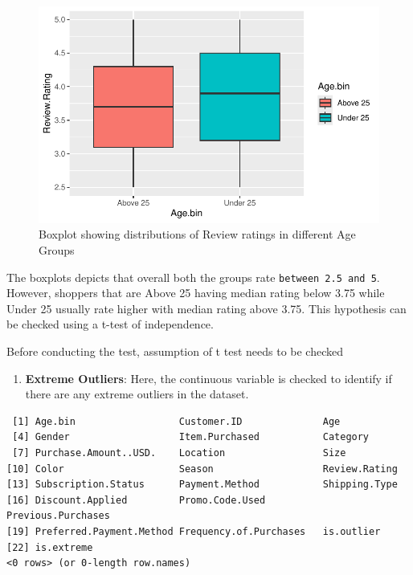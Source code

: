 \documentclass[
  letterpaper,
  DIV=11,
  numbers=noendperiod]{scrartcl}
\providecommand{\tightlist}{%
  \setlength{\itemsep}{0pt}\setlength{\parskip}{0pt}}\usepackage{longtable,booktabs,array}
\begin{document}
\begin{figure}[H]

{\centering \includegraphics{Customer_Preference_Analytics_files/figure-pdf/unnamed-chunk-26-1.pdf}

}

\caption{Boxplot showing distributions of Review ratings in different
Age Groups}

\end{figure}%

The boxplots depicts that overall both the groups rate
\texttt{between\ 2.5\ and\ 5}. However, shoppers that are Above 25
having median rating below 3.75 while Under 25 usually rate higher with
median rating above 3.75. This hypothesis can be checked using a t-test
of independence.

Before conducting the test, assumption of t test needs to be checked

\begin{enumerate}
\def\labelenumi{\roman{enumi}.}
\tightlist
\item
  \textbf{Extreme Outliers}: Here, the continuous variable is checked to
  identify if there are any extreme outliers in the dataset.
\end{enumerate}

\begin{verbatim}
 [1] Age.bin                  Customer.ID              Age                     
 [4] Gender                   Item.Purchased           Category                
 [7] Purchase.Amount..USD.    Location                 Size                    
[10] Color                    Season                   Review.Rating           
[13] Subscription.Status      Payment.Method           Shipping.Type           
[16] Discount.Applied         Promo.Code.Used          Previous.Purchases      
[19] Preferred.Payment.Method Frequency.of.Purchases   is.outlier              
[22] is.extreme              
<0 rows> (or 0-length row.names)
\end{verbatim}
\end{document}
